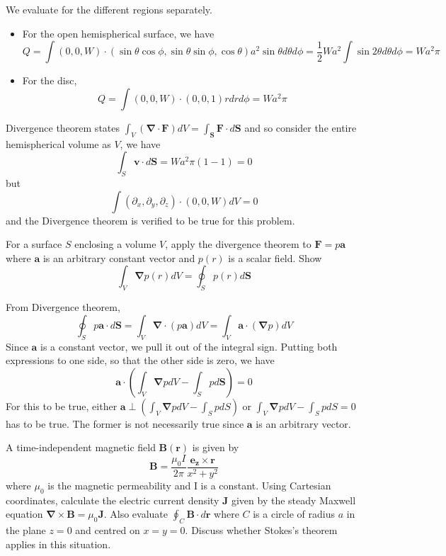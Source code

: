 \documentclass[a4paper]{article}
\begin{document}
\begin{ans} We evaluate for the different regions separately.
\begin{itemize}
    \item For the open hemispherical surface, we have
    $$Q=\int(0,0,W)\cdot(\sin\theta\cos\phi,\sin\theta\sin\phi,\cos\theta)a^2\sin\theta d\theta d\phi=\frac{1}{2}Wa^2\int\sin2\theta d\theta d\phi=Wa^2\pi$$
    \item For the disc, 
    $$Q=\int (0,0,W)\cdot(0,0,1)rdrd\phi=Wa^2\pi$$
\end{itemize}
Divergence theorem states $\int_V(\boldsymbol{\nabla}\cdot\mathbf{F})dV=\int_\mathbf{S}\mathbf{F}\cdot d\mathbf{S}$ and so consider the entire hemispherical volume as $V$, we have
$$\int_S\mathbf{v}\cdot d\mathbf{S}=Wa^2\pi(1-1)=0$$
but
$$\int (\partial_x,\partial_y,\partial_z)\cdot(0,0,W)dV=0$$
and the Divergence theorem is verified to be true for this problem.
\end{ans}
\begin{qns}
For a surface $S$ enclosing a volume $V$, apply the divergence theorem to $\mathbf{F}=p\mathbf{a}$ where $\mathbf{a}$ is an arbitrary constant vector and $p(r)$ is a scalar field. Show
$$\int_V\boldsymbol{\nabla}p(r)dV=\oint_Sp(r)d\mathbf{S}$$
\end{qns}
\begin{ans}
From Divergence theorem,
$$\oint_Sp\mathbf{a}\cdot d\mathbf{S}=\int_V\boldsymbol{\nabla}\cdot(p\mathbf{a})dV=\int_V\boldsymbol{a}\cdot(\boldsymbol{\nabla}p)dV$$
Since $\mathbf{a}$ is a constant vector, we pull it out of the integral sign. Putting both expressions to one side, so that the other side is zero, we have $$\mathbf{a}\cdot(\int_V\boldsymbol{\nabla}pdV-\int_Sp d\mathbf{S})=0$$
For this to be true, either $\mathbf{a}\perp(\int_V\boldsymbol{\nabla}pdV-\int_SpdS)$ or $\int_V\boldsymbol{\nabla}pdV-\int_SpdS=0$ has to be true. The former is not necessarily true since $\mathbf{a}$ is an arbitrary vector.
\end{ans}
\newpage
\begin{qns}
A time-independent magnetic field $\mathbf{B}(\mathbf{r})$ is given by
$$\mathbf{B}=\frac{\mu_0I}{2\pi}\frac{\mathbf{e_z}\times\mathbf{r}}{x^2+y^2}$$
where $\mu_0$ is the magnetic permeability and I is a constant. Using Cartesian coordinates, calculate the electric current density $\mathbf{J}$ given by the steady Maxwell equation $\boldsymbol{\nabla}\times\mathbf{B}=\mu_0\mathbf{J}$. Also evaluate $\oint_C\mathbf{B}\cdot d\mathbf{r}$ where $C$ is a circle of radius $a$ in the plane
$z = 0$ and centred on $x = y = 0$. Discuss whether Stokes's theorem applies in this
situation.
\end{qns}
\end{document}
